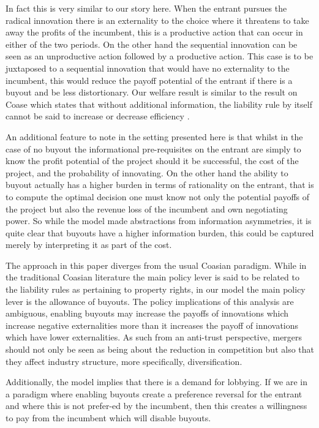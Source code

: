 \documentclass[11pt]{article}
\begin{document}
In fact this is very similar to our story here. When the entrant pursues the radical innovation there is an externality to the choice where it threatens to take away the profits of the incumbent, this is a productive action that can occur in either of the two periods. On the other hand the sequential innovation can be seen as an unproductive action followed by a productive action. This case is to be juxtaposed to a sequential innovation that would have no externality to the incumbent, this would reduce the payoff potential of the entrant if there is a buyout and be less distortionary. Our welfare result is similar to the result on Coase which states that without additional information, the liability rule by itself cannot be said to increase or decrease efficiency \cite{Dem}. 

An additional feature to note in the setting presented here is that whilst in the case of no buyout the informational pre-requisites on the entrant are simply to know the profit potential of the project should it be successful, the cost of the project, and the probability of innovating. On the other hand the ability to buyout actually has a higher burden in terms of rationality on the entrant, that is to compute the optimal decision one must know not only the potential payoffs of the project but also the revenue loss of the incumbent and own negotiating power. So while the model made abstractions from information asymmetries, it is quite clear that buyouts have a higher information burden, this could be captured merely by interpreting it as part of the cost. 

The approach in this paper diverges from the usual Coasian paradigm. While in the traditional Coasian literature the main policy lever is said to be related to the liability rules as pertaining to property rights, in our model the main policy lever is the allowance of buyouts.  The policy implications of this analysis are ambiguous, enabling buyouts may increase the payoffs of innovations which increase negative externalities more than it increases the payoff of innovations which have lower externalities. As such from an anti-trust perspective, mergers should not only be seen as being about the reduction in competition but also that they affect industry structure, more specifically, diversification.  

Additionally, the model implies that there is a demand for lobbying. If we are in a paradigm where enabling buyouts create a preference reversal for the entrant and where this is not prefer-ed by the incumbent, then this creates a willingness to pay from the incumbent which will disable buyouts. 
\end{document}
